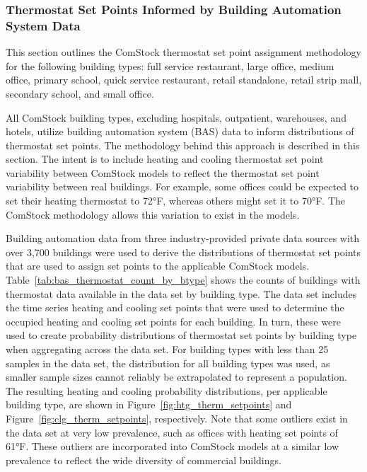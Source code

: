\subsubsection{Thermostat Set Points Informed by Building Automation System Data}
\label{section:therm_setpoints_bas}

This section outlines the ComStock thermostat set point assignment methodology for the following building types: full service restaurant, large office, medium office, primary school, quick service restaurant, retail standalone, retail strip mall, secondary school, and small office.  

All ComStock building types, excluding hospitals, outpatient, warehouses, and hotels, utilize building automation system (BAS) data to inform distributions of thermostat set points. The methodology behind this approach is described in this section. The intent is to include heating and cooling thermostat set point variability between ComStock models to reflect the thermostat set point variability between real buildings. For example, some offices could be expected to set their heating thermostat to 72°F, whereas others might set it to 70°F. The ComStock methodology allows this variation to exist in the models.

Building automation data from three industry-provided private data sources with over 3,700 buildings were used to derive the distributions of thermostat set points that are used to assign set points to the applicable ComStock models. Table~\ref{tab:bas_thermostat_count_by_btype} shows the counts of buildings with thermostat data available in the data set by building type. The data set includes the time series heating and cooling set points that were used to determine the occupied heating and cooling set points for each building. In turn, these were used to create probability distributions of thermostat set points by building type when aggregating across the data set. For building types with less than 25 samples in the data set, the distribution for all building types was used, as smaller sample sizes cannot reliably be extrapolated to represent a population. The resulting heating and cooling probability distributions, per applicable building type, are shown in Figure~\ref{fig:htg_therm_setpoints} and Figure~\ref{fig:clg_therm_setpoints}, respectively. Note that some outliers exist in the data set at very low prevalence, such as offices with heating set points of 61°F. These outliers are incorporated into ComStock models at a similar low prevalence to reflect the wide diversity of commercial buildings. 

